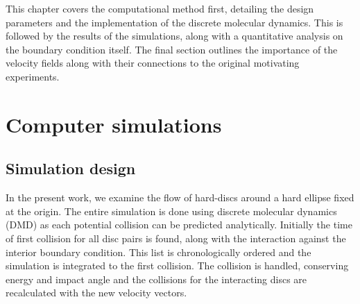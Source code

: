 

This chapter covers the computational method first, detailing the design parameters and the implementation of the discrete molecular dynamics. This is followed by the results of the simulations, along with a quantitative analysis on the boundary condition itself. The final section outlines the importance of the velocity fields along with their connections to the original motivating experiments.

\section{Computer simulations}


\subsection{Simulation design}

In the present work, we examine the flow of hard-discs around a hard ellipse fixed at the origin. The entire simulation is done using discrete molecular dynamics (DMD) as each potential collision can be predicted analytically. Initially the time of first collision for all disc pairs is found, along with the interaction against the interior boundary condition. This list is chronologically ordered and the simulation is integrated to the first collision. The collision is handled, conserving energy and impact angle and the collisions for the interacting discs are recalculated with the new velocity vectors. 

